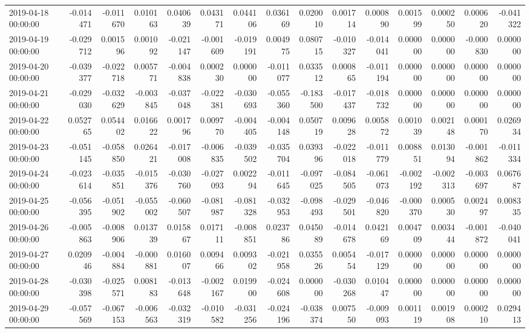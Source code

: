 \begin{tabular}{lrrrrrrrrrrrrrr}
2019-04-18 00:00:00 & -0.014471 & -0.011670 & 0.010163 & 0.040639 & 0.043171 & 0.044106 & 0.036169 & 0.020010 & 0.001714 & 0.000890 & 0.001599 & 0.000250 & 0.000620 & -0.041322 \\
2019-04-19 00:00:00 & -0.029712 & 0.001596 & 0.001092 & -0.021147 & -0.001609 & -0.019191 & 0.004975 & 0.080715 & -0.010327 & -0.014041 & 0.000000 & 0.000000 & -0.000830 & 0.000000 \\
2019-04-20 00:00:00 & -0.039377 & -0.022718 & 0.005771 & -0.004838 & 0.000230 & 0.000000 & -0.011077 & 0.033512 & 0.000865 & -0.011194 & 0.000000 & 0.000000 & 0.000000 & 0.000000 \\
2019-04-21 00:00:00 & -0.029030 & -0.032629 & -0.003845 & -0.037048 & -0.022381 & -0.030693 & -0.055360 & -0.183500 & -0.017437 & -0.018732 & 0.000000 & 0.000000 & 0.000000 & 0.000000 \\
2019-04-22 00:00:00 & 0.052765 & 0.054402 & 0.016622 & 0.001796 & 0.009770 & -0.004405 & -0.004148 & 0.050719 & 0.009628 & 0.005872 & 0.001039 & 0.002148 & 0.000170 & 0.026934 \\
2019-04-23 00:00:00 & -0.051145 & -0.058850 & 0.026421 & -0.017008 & -0.006835 & -0.039502 & -0.035704 & 0.039396 & -0.022018 & -0.011779 & 0.008851 & 0.013094 & -0.001862 & -0.011334 \\
2019-04-24 00:00:00 & -0.023614 & -0.035851 & -0.015376 & -0.030760 & -0.027093 & 0.002294 & -0.011645 & -0.097025 & -0.084505 & -0.061073 & -0.002192 & -0.002313 & -0.003697 & 0.067687 \\
2019-04-25 00:00:00 & -0.056395 & -0.051902 & -0.055002 & -0.060507 & -0.081987 & -0.081328 & -0.032953 & -0.098493 & -0.029501 & -0.046820 & -0.000370 & 0.000530 & 0.002497 & 0.008335 \\
2019-04-26 00:00:00 & -0.005863 & -0.008906 & 0.013739 & 0.015867 & 0.017111 & -0.008851 & 0.023786 & 0.045089 & -0.014678 & 0.042169 & 0.004709 & 0.003444 & -0.001872 & -0.040041 \\
2019-04-27 00:00:00 & 0.020946 & -0.004884 & -0.000881 & 0.016007 & 0.009466 & 0.009302 & -0.021958 & 0.035526 & 0.005454 & -0.017129 & 0.000000 & 0.000000 & 0.000000 & 0.000000 \\
2019-04-28 00:00:00 & -0.030398 & -0.025571 & 0.008183 & -0.013648 & -0.002167 & 0.019900 & -0.024608 & 0.000000 & -0.030268 & 0.010447 & 0.000000 & 0.000000 & 0.000000 & 0.000000 \\
2019-04-29 00:00:00 & -0.057569 & -0.067153 & -0.006563 & -0.032319 & -0.010582 & -0.031256 & -0.024196 & -0.038374 & 0.007550 & -0.009093 & 0.001119 & 0.001908 & 0.000210 & 0.029413 \\

\end{tabular}
